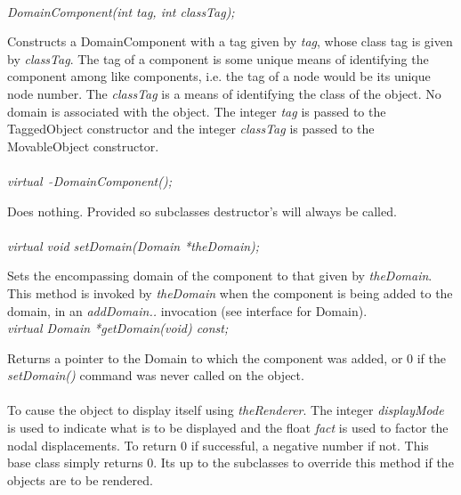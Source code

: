   \\
{\em DomainComponent(int tag, int classTag);}  

Constructs a DomainComponent with a tag given by {\em tag}, whose
class tag is given by {\em classTag}. The tag of
a component is some unique means of identifying the component among
like components, i.e. the tag of a node would be its unique node
number. The {\em classTag} is a means of identifying the class of the object.
No domain is associated with the object. The integer {\em tag} is
passed to the TaggedObject constructor and the integer {\em classTag}
is passed to the MovableObject constructor. \\

  \\
{\em virtual~ $\tilde{}$DomainComponent();}  

Does nothing. Provided so subclasses destructor's will always be
called. \\

  \\
{\em virtual void setDomain(Domain *theDomain);} 

Sets the encompassing domain of the component to that given by {\em
theDomain}. This method is invoked by {\em theDomain} when the component is
being added to the domain, in an {\em addDomain..} invocation (see
interface for Domain). \\

{\em virtual Domain *getDomain(void) const;}

Returns a pointer to the Domain to which the component was added,
or $0$ if the {\em setDomain()} command was never called on the
object. \\

 \\ 
To cause the object to display itself using {\em theRenderer}. The
integer {\em displayMode} is used to indicate what is to be displayed
and the float {\em fact} is used to factor the nodal displacements. 
To return $0$ if successful, a negative number if not. This base
class simply returns $0$. Its up to the subclasses to override this
method if the objects are to be rendered.

